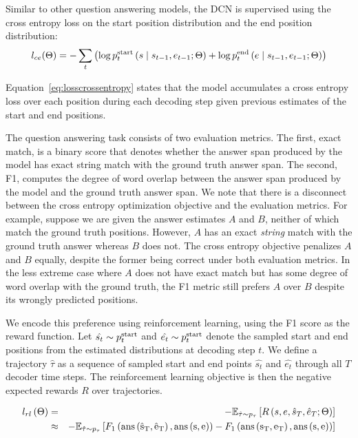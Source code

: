 \documentclass{article} %
\begin{document}
Similar to other question answering models, the DCN is supervised using the cross entropy loss on the start position distribution and the end position distribution:
\begin{equation}
\label{eq:losscrossentropy}
l_{ce}(\Theta) = - \sum_t \left( \log p^{\rm{start}}_t \left( s \mid s_{t-1}, e_{t-1} ; \Theta \right) + \log p^{\rm{end}}_t \left( e \mid s_{t-1}, e_{t-1} ; \Theta \right) \right)
\end{equation}

Equation~\ref{eq:losscrossentropy} states that the model accumulates a cross entropy loss over each position during each decoding step given previous estimates of the start and end positions.

The question answering task consists of two evaluation metrics.
The first, exact match, is a binary score that denotes whether the answer span produced by the model has exact string match with the ground truth answer span.
The second, F1, computes the degree of word overlap between the answer span produced by the model and the ground truth answer span.
We note that there is a disconnect between the cross entropy optimization objective and the evaluation metrics. 
For example, suppose we are given the answer estimates $A$ and $B$, neither of which match the ground truth positions.
However, $A$ has an exact \emph{string} match with the ground truth answer whereas $B$ does not.
The cross entropy objective penalizes $A$ and $B$ equally, despite the former being correct under both evaluation metrics.
In the less extreme case where $A$ does not have exact match but has some degree of word overlap with the ground truth, the F1 metric still prefers $A$ over $B$ despite its wrongly predicted positions.

We encode this preference using reinforcement learning, using the F1 score as the reward function.
Let $\hat{s_t} \sim p^{\rm{start}}_t$ and $\hat{e_t} \sim p^{\rm{start}}_t$ denote the sampled start and end positions from the estimated distributions at decoding step $t$.
We define a trajectory $\hat{\tau}$ as a sequence of sampled start and end points $\hat{s_t}$ and $\hat{e_t}$ through all $T$ decoder time steps.
The reinforcement learning objective is then the negative expected rewards $R$ over trajectories.

\begin{eqnarray}
l_{rl}\left(\Theta\right) &=&
- \mathbb{E}_{\hat{\tau} \sim p_{\tau}}
\left[
	R \left(s, e, \hat{s}_T, \hat{e}_T ; \Theta \right)
\right]
\\
&\approx&
\label{eq:baseline}
- \mathbb{E}_{\hat{\tau} \sim p_{\tau}}
\left[
	F_1
    \left(
    	\rm{ans}\left( {\hat{s}_T}, {\hat{e}_T}\right),
        \rm{ans}\left( {s}, {e}\right)
    \right)
    -
 	F_1
    \left(
	    \rm{ans}\left( {s_T}, {e_T}\right),
        \rm{ans}\left( {s}, {e}\right)
    \right)
\right]
\end{eqnarray}
\end{document}
